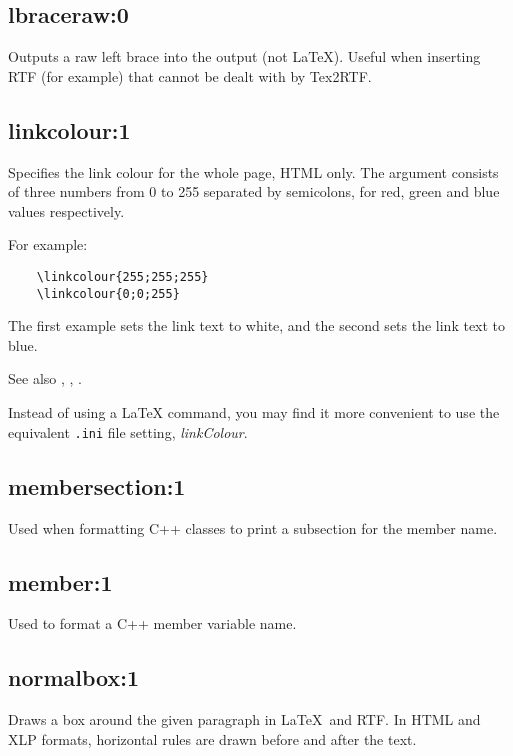 \subsection*{lbraceraw:0}\label{lbraceraw}

Outputs a raw left brace into the output (not LaTeX). Useful when
inserting RTF (for example) that cannot be dealt with by Tex2RTF.

\subsection*{linkcolour:1}\label{linkcolour}

Specifies the link colour for the whole page, HTML only. The argument consists
of three numbers from 0 to 255 separated by semicolons, for red, green and blue values respectively.

For example:

\begin{verbatim}
    \linkcolour{255;255;255}
    \linkcolour{0;0;255}
\end{verbatim}

The first example sets the link text to white, and the second sets the link text to blue.

See also , ,
\rtfsp{}.

Instead of using a LaTeX command, you may find it more convenient to use the equivalent {\tt .ini} file
setting, {\it linkColour}.

\subsection*{membersection:1}\label{membersection}

Used when formatting C++ classes to print a subsection for the member name.

\subsection*{member:1}\label{member}

Used to format a C++ member variable name.

\subsection*{normalbox:1}\label{normalbox}

Draws a box around the given paragraph in \LaTeX\ and RTF. In HTML
and XLP formats, horizontal rules are drawn before and after the text.

